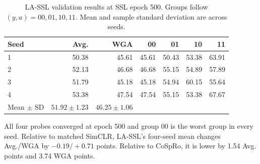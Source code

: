 \documentclass{article}
\begin{document}
\begin{table}[H]
\centering\small
\caption{LA-SSL validation results at SSL epoch 500. Groups follow $(y,a) = 00, 01, 10, 11$. Mean and sample standard deviation are across seeds.}
\begin{tabular}{lrrrrrr}
\toprule
Seed & Avg. & WGA & 00 & 01 & 10 & 11 \\
\midrule
1 & 50.38 & 45.61 & 45.61 & 50.43 & 53.38 & 63.91 \\
2 & 52.13 & 46.68 & 46.68 & 55.15 & 54.89 & 57.89 \\
3 & 51.79 & 45.18 & 45.18 & 54.94 & 60.15 & 55.64 \\
4 & 53.38 & 47.54 & 47.54 & 55.15 & 53.38 & 67.67 \\
\midrule
Mean $\pm$ SD & $51.92\pm1.23$ & $46.25\pm1.06$ & & & & \\
\bottomrule
\end{tabular}
\label{tab:lassl}
\end{table}

All four probes converged at epoch 500 and group 00 is the worst group in every seed. Relative to matched SimCLR, LA-SSL's four-seed mean changes Avg./WGA by $-0.19/+0.71$ points. Relative to CoSpRo, it is lower by 1.54 Avg. points and 3.74 WGA points.
\end{document}
